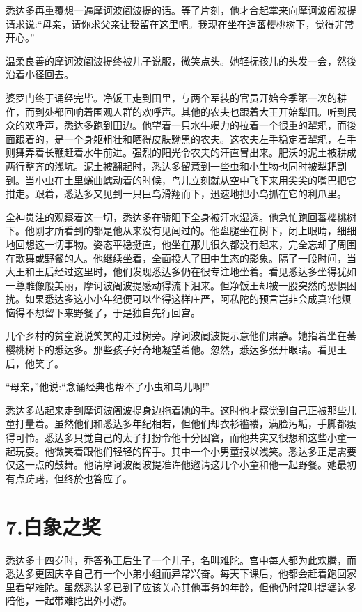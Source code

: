 \documentclass[12pt,twoside,openany]{book}
\begin{document}
悉达多再重覆想一遍摩诃波阇波提的话。等了片刻，他才合起掌来向摩诃波阇波提请求说:“母亲，请你求父亲让我留在这里吧。我现在坐在造蕃樱桃树下，觉得非常开心。”

温柔良善的摩诃波阇波提终被儿子说服，微笑点头。她轻抚孩儿的头发一会，然後沿着小径回去。

婆罗门终于诵经完毕。净饭王走到田里，与两个军装的官员开始今季第一次的耕作，而到处都回响着围观人群的欢呼声。其他的农夫也跟着大王开始犁田。听到民众的欢呼声，悉达多跑到田边。他望着一只水牛竭力的拉着一个很重的犁耙，而後面跟着的，是一个身躯粗壮和晒得皮肤黝黑的农夫。这农夫左手稳定着犁耙，右手则舞弄着长鞭赶着水牛前进。强烈的阳光令农夫的汗直冒出来。肥沃的泥土被耕成两行整齐的浅坑。泥土被翻起时，悉达多留意到一些虫和小生物也同时被犁耙割到。当小虫在土里蜷曲蠕动着的时候，鸟儿立刻就从空中飞下来用尖尖的嘴巴把它拑走。跟着，悉达多又见到一只巨鸟滑翔而下，迅速地把小鸟抓在它的利爪里。

全神贯注的观察着这一切，悉达多在骄阳下全身被汗水湿透。他急忙跑回蕃樱桃树下。他刚才所看到的都是他从来没有见闻过的。他盘腿坐在树下，闭上眼睛，细细地回想这一切事物。姿态平稳挺直，他坐在那儿很久都没有起来，完全忘却了周围在歌舞或野餐的人。他继续坐着，全面投人了田中生态的影象。隔了一段时间，当大王和王后经过这里时，他们发现悉达多仍在很专注地坐着。看见悉达多坐得犹如一尊雕像般美丽，摩诃波阇波提感动得流下泪来。但净饭王却被一股突然的恐惧困扰。如果悉达多这小小年纪便可以坐得这样庄严，阿私陀的预言岂非会成真?他烦恼得不想留下来野餐了，于是独自先行回宫。

几个乡村的贫童说说笑笑的走过树旁。摩诃波阇波提示意他们肃静。她指着坐在蕃樱桃树下的悉达多。那些孩子好奇地凝望着他。忽然，悉达多张开眼睛。看见王后，他笑了。

“母亲，”他说:“念诵经典也帮不了小虫和鸟儿啊!”

悉达多站起来走到摩诃波阇波提身边拖着她的手。这时他才察觉到自己正被那些儿童打量着。虽然他们和悉达多年纪相若，但他们却衣衫褴褛，满脸污垢，手脚都瘦得可怜。悉达多只觉自己的太子打扮令他十分困窘，而他共实又很想和这些小童一起玩耍。他微笑着跟他们轻轻的挥手。其中一个小男童报以浅笑。悉达多正是需要仅这一点的鼓舞。他请摩诃波阇波提准许他邀请这几个小童和他一起野餐。她最初有点踌躇，但终於也答应了。

\chapter{7.白象之奖}\label{ch7}

悉达多十四岁时，乔答弥王后生了一个儿子，名叫难陀。宫中每人都为此欢腾，而悉达多更因庆幸自己有一个小弟小组而异常兴奋。每天下课后，他都会赶着跑回家里看望难陀。虽然悉达多已到了应该关心其他事务的年龄，但他仍时常叫提婆达多陪他，一起带难陀出外小游。
\end{document}
